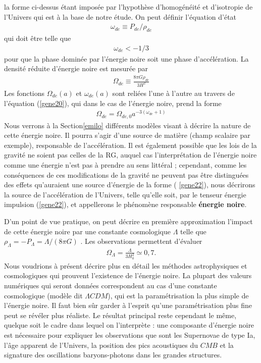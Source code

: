 \documentclass[a4paper,12pt]{report}
\theoremstyle{plain}
\theoremstyle{plain}
\begin{document}
la forme ci-dessus \'etant impos\'ee par l'hypoth\`ese d'homog\'en\'eit\'e et d'isotropie de l'Univers
qui est \`a la base de notre \'etude. On peut d\'efinir l'\'equation d'\'etat
\begin{eqnarray}
 \omega_{de} \equiv P_{de}/\rho_{de}
\end{eqnarray}
qui doit \^etre telle que
\begin{eqnarray}
 \omega_{de}<-1/3
\end{eqnarray}
pour que la phase domin\'ee par l'\'energie noire soit une phase d'acc\'el\'eration. La densit\'e
r\'eduite d'\'energie noire est mesur\'ee par
\begin{eqnarray}
 \Omega_{de} \equiv \frac{8 \pi G \rho_{ de}}{3 H^2} \label{gene25}
\end{eqnarray}
Les fonctions $ \Omega_{de}(a) $  et $ \omega_{de}(a) $ sont reli\'ees l'une \`a l'autre au travers de l'\'equation (\ref{gene20}),
qui dans le cas de l'\'energie noire, prend la forme
\begin{eqnarray}
 \Omega_{de} = \Omega_{de,0}a^{-3(\omega_{de} +1)}
\end{eqnarray}
Nous verrons \`a la Section\ref{emilo}  diff\'erents mod\`eles visant \`a d\'ecrire la nature de cette
\'energie noire. Il pourra s'agir d'une source de mati\`ere (champ scalaire par exemple), 
responsable de l'acc\'el\'eration. Il est \'egalement possible que les lois de la gravit\'e ne soient pas
celles de la RG, auquel cas l'interpr\'etation de l'\'energie noire comme une \'energie n'est pas
\`a prendre au sens litt\'eral ; cependant, comme les cons\'equences de ces modifications de la
gravit\'e ne peuvent pas \^etre distingu\'ees des effets qu'auraient une source d'\'energie de la
forme ( \ref{gene22}), nous d\'ecrirons la source de l'acc\'el\'eration de l'Univers, telle qu'elle soit,
par le tenseur \'energie impulsion (\ref{gene22}), et appellerons le ph\'enom\`ene responsable {\bf  \'energie 
noire}.

D'un point de vue pratique, on peut d\'ecrire en premi\`ere approximation l'impact de
cette \'energie noire par une constante cosmologique $ \Lambda$ telle que   $ \rho_\Lambda = - P_\Lambda = \Lambda / ( 8 \pi G)$ . Les
observations permettent d'\'evaluer
\begin{eqnarray}
 \Omega_\Lambda = \frac{\Lambda}{ 3 H_0^2} \simeq 0,7.
\end{eqnarray}
Nous voudrions \`a pr\'esent d\'ecrire plus en d\'etail les m\'ethodes astrophysiques et 
cosmologiques qui prouvent l'existence de l'\'energie noire. La plupart des valeurs num\'eriques qui
seront donn\'ees correspondent au cas d'une constante cosmologique (mod\`ele dit $ \Lambda CDM $),
qui est la param\'etrisation la plus simple de l'\'energie noire. Il faut bien s\^ur garder \`a l'esprit
qu'une param\'etrisation plus fine peut se r\'ev\'eler plus r\'ealiste. Le r\'esultat principal reste
cependant le m\^eme, quelque soit le cadre dans lequel on l'interpr\`ete : une composante
d'\'energie noire est n\'ecessaire pour expliquer les observations que sont les Supernovae de
type Ia, l'\^age apparent de l'Univers, la position des pics acoustiques du $CMB$ et la signature
des oscillations baryons-photons dans les grandes structures.
\end{document}
